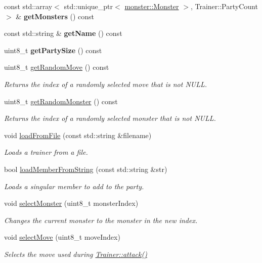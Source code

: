 \begin{DoxyCompactItemize}
const std\+::array$<$ std\+::unique\+\_\+ptr$<$ \hyperlink{classmonsterbattle_1_1monster_1_1Monster}{monster\+::\+Monster} $>$, Trainer\+::\+Party\+Count $>$ \& {\bfseries get\+Monsters} () const
\item 
\mbox{\label{classmonsterbattle_1_1Trainer_aff1259c6f8747ab352de343d5eecacd3}} 
const std\+::string \& {\bfseries get\+Name} () const
\item 
\mbox{\label{classmonsterbattle_1_1Trainer_ad6c7287f086d8e44ff39756ae931bfa3}} 
uint8\+\_\+t {\bfseries get\+Party\+Size} () const
\item 
uint8\+\_\+t \hyperlink{classmonsterbattle_1_1Trainer_a02371052b251c3fb1eaa9fc2b1cc1e36}{get\+Random\+Move} () const
\begin{DoxyCompactList}\small\item\em Returns the index of a randomly selected move that is not N\+U\+LL. \end{DoxyCompactList}\item 
uint8\+\_\+t \hyperlink{classmonsterbattle_1_1Trainer_a6e369b2d164e3c1040add317848fed6b}{get\+Random\+Monster} () const
\begin{DoxyCompactList}\small\item\em Returns the index of a randomly selected monster that is not N\+U\+LL. \end{DoxyCompactList}\item 
void \hyperlink{classmonsterbattle_1_1Trainer_a6386eb812b206577976c32dc019ea264}{load\+From\+File} (const std\+::string \&filename)
\begin{DoxyCompactList}\small\item\em Loads a trainer from a file. \end{DoxyCompactList}\item 
bool \hyperlink{classmonsterbattle_1_1Trainer_af0631657f9cde8107028b9d631ca8d33}{load\+Member\+From\+String} (const std\+::string \&str)
\begin{DoxyCompactList}\small\item\em Loads a singular member to add to the party. \end{DoxyCompactList}\item 
void \hyperlink{classmonsterbattle_1_1Trainer_ac2b909ae71d2ef663b8e4171dcaae0f1}{select\+Monster} (uint8\+\_\+t monster\+Index)
\begin{DoxyCompactList}\small\item\em Changes the current monster to the monster in the new index. \end{DoxyCompactList}\item 
void \hyperlink{classmonsterbattle_1_1Trainer_afecf5285dffbf9858492c337010f2e9b}{select\+Move} (uint8\+\_\+t move\+Index)
\begin{DoxyCompactList}\small\item\em Selects the move used during \hyperlink{classmonsterbattle_1_1Trainer_ac15af2a463e8241ac432f81b1b64e015}{Trainer\+::attack()} \end{DoxyCompactList}\end{DoxyCompactItemize}
